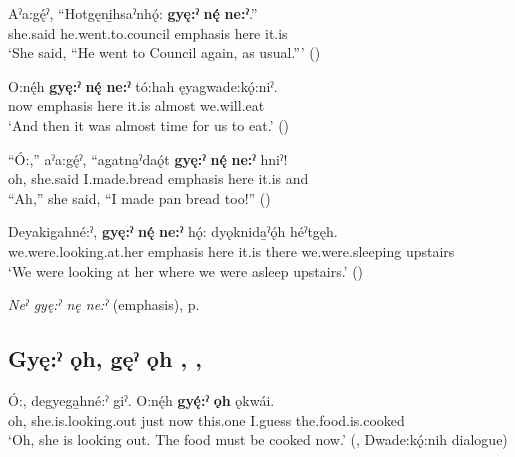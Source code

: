 \ea
\label{ex:gpar134}
\gll Aˀa:gę́ˀ, “Hotgęni̱hsaˀnhǫ́: \textbf{gyę:ˀ} \textbf{nę́} \textbf{ne:ˀ}.”\\
she.said he.went.to.council emphasis here it.is\\
\glt ‘She said, “He went to Council again, as usual.”’ (\cite{henry_de_2005})
\z

\ea
\label{ex:gpar135}
\gll O:nę́h \textbf{gyę:ˀ} \textbf{nę́} \textbf{ne:ˀ} tó:hah ęyagwade:kǫ́:niˀ.\\
now emphasis here it.is almost we.will.eat\\
\glt ‘And then it was almost time for us to eat.’ (\cite{henry_de_2005})
\z

\ea
\label{ex:gpar136}
\gll “Ó:,” aˀa:gę́ˀ, “agatna̱ˀdaǫ́t \textbf{gyę:ˀ} \textbf{nę́} \textbf{ne:ˀ} hniˀ!\\
oh, she.said I.made.bread emphasis here it.is and\\
\glt “Ah,” she said, “I made pan bread too!” (\cite{henry_de_2005})
\z

\ea
\label{ex:gpar137}
\gll Deyakigahné:ˀ, \textbf{gyę:ˀ} \textbf{nę́} \textbf{ne:ˀ} hǫ́: dyǫknida̱ˀǫ́h héˀtgęh.\\
we.were.looking.at.her emphasis here it.is there we.were.sleeping upstairs\\
\glt ‘We were looking at her where we were asleep upstairs.’ (\cite{henry_de_2005})
\z

\begin{CayugaRelated}
\item \textit{Neˀ gyę:ˀ nę ne:ˀ} (emphasis), p. \pageref{p:[neˀ gyę:ˀ neˀ gyę:ˀ]}
\end{CayugaRelated}


\subsection*{\textbf{Gyę:ˀ ǫh, gęˀ ǫh} , , } \label{p:[gyę:ˀ ǫh]}

\ea
\label{ex:gpar124}
\gll Ó:, degyega̱hné:ˀ giˀ. O:nę́h \textbf{gyę́:ˀ} \textbf{ǫh} ǫkwái.\\
oh, she.is.looking.out just now this.one I.guess the.food.is.cooked\\
\glt ‘Oh, she is looking out. The food must be cooked now.’ (\cite[294]{mithun_watewayestanih_1984}, Dwade:kǫ́:nih dialogue)
\z

